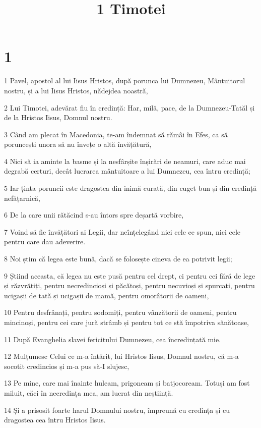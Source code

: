

\title{1 Timotei}


\chapter{1}

\par 1 Pavel, apostol al lui Iisus Hristos, după porunca lui Dumnezeu, Mântuitorul nostru, și a lui Iisus Hristos, nădejdea noastră,
\par 2 Lui Timotei, adevărat fiu în credință: Har, milă, pace, de la Dumnezeu-Tatăl și de la Hristos Iisus, Domnul nostru.
\par 3 Când am plecat în Macedonia, te-am îndemnat să rămâi în Efes, ca să poruncești unora să nu învețe o altă învățătură,
\par 4 Nici să ia aminte la basme și la nesfârșite înșirări de neamuri, care aduc mai degrabă certuri, decât lucrarea mântuitoare a lui Dumnezeu, cea întru credință;
\par 5 Iar ținta poruncii este dragostea din inimă curată, din cuget bun și din credință nefățarnică,
\par 6 De la care unii rătăcind s-au întors spre deșartă vorbire,
\par 7 Voind să fie învățători ai Legii, dar neînțelegând nici cele ce spun, nici cele pentru care dau adeverire.
\par 8 Noi știm că legea este bună, dacă se folosește cineva de ea potrivit legii;
\par 9 Știind aceasta, că legea nu este pusă pentru cel drept, ci pentru cei fără de lege și răzvrătiți, pentru necredincioși și păcătoși, pentru necuvioși și spurcați, pentru ucigașii de tată și ucigașii de mamă, pentru omorâtorii de oameni,
\par 10 Pentru desfrânați, pentru sodomiți, pentru vânzătorii de oameni, pentru mincinoși, pentru cei care jură strâmb și pentru tot ce stă împotriva sănătoase,
\par 11 După Evanghelia slavei fericitului Dumnezeu, cea încredințată mie.
\par 12 Mulțumesc Celui ce m-a întărit, lui Hristos Iisus, Domnul nostru, că m-a socotit credincios și m-a pus să-I slujesc,
\par 13 Pe mine, care mai înainte huleam, prigoneam și batjocoream. Totuși am fost miluit, căci în necredința mea, am lucrat din neștiință.
\par 14 Și a prisosit foarte harul Domnului nostru, împreună cu credința și cu dragostea cea întru Hristos Iisus.
